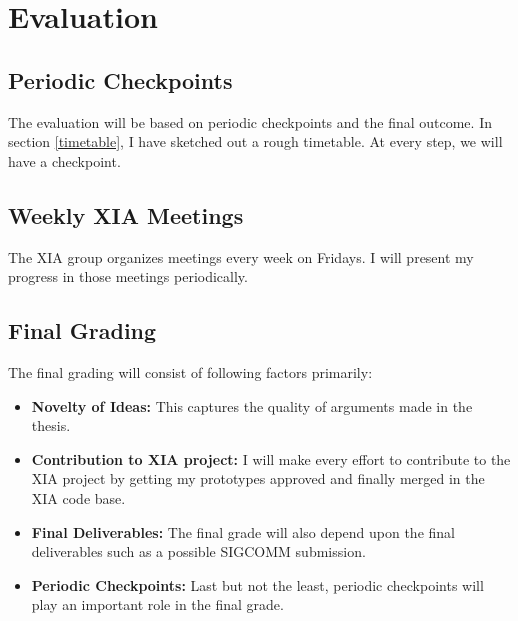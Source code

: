\section{Evaluation}
\subsection{Periodic Checkpoints}
The evaluation will be based on periodic checkpoints and the final
outcome. In section \ref{timetable}, I have sketched out a rough
timetable. At every step, we will have a checkpoint.
\subsection{Weekly XIA Meetings}
The XIA group organizes meetings every week on Fridays. I will present
my progress in those meetings periodically.
\subsection{Final Grading}
The final grading will consist of following factors primarily:
\begin{itemize}
\item \textbf{Novelty of Ideas:} This captures the quality of
  arguments made in the thesis.
\item \textbf{Contribution to XIA project:} I will make every effort
  to contribute to the XIA project by getting my prototypes approved
  and finally merged in the XIA code base.
\item \textbf{Final Deliverables:} The final grade will also depend
  upon the final deliverables such as a possible SIGCOMM submission.
\item \textbf{Periodic Checkpoints:} Last but not the least, periodic
  checkpoints will play an important role in the final grade.
\end{itemize}
